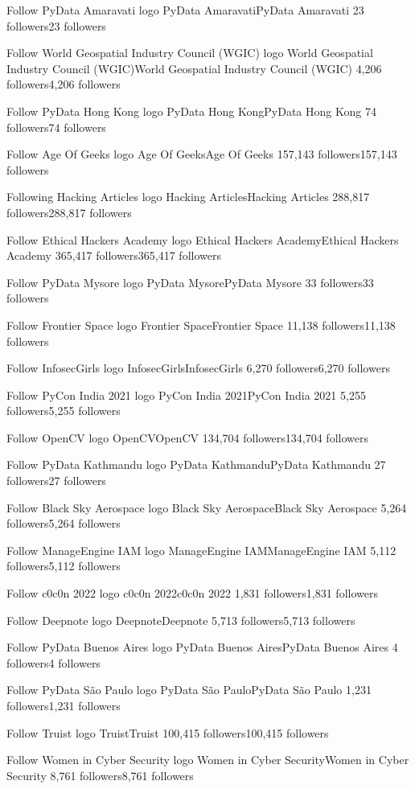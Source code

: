 Follow
PyData Amaravati logo
PyData AmaravatiPyData Amaravati
23 followers23 followers

Follow
World Geospatial Industry Council (WGIC) logo
World Geospatial Industry Council (WGIC)World Geospatial Industry Council (WGIC)
4,206 followers4,206 followers

Follow
PyData Hong Kong logo
PyData Hong KongPyData Hong Kong
74 followers74 followers

Follow
Age Of Geeks logo
Age Of GeeksAge Of Geeks
157,143 followers157,143 followers

Following
Hacking Articles logo
Hacking ArticlesHacking Articles
288,817 followers288,817 followers

Follow
Ethical Hackers Academy logo
Ethical Hackers AcademyEthical Hackers Academy
365,417 followers365,417 followers

Follow
PyData Mysore logo
PyData MysorePyData Mysore
33 followers33 followers

Follow
Frontier Space logo
Frontier SpaceFrontier Space
11,138 followers11,138 followers

Follow
InfosecGirls logo
InfosecGirlsInfosecGirls
6,270 followers6,270 followers

Follow
PyCon India 2021 logo
PyCon India 2021PyCon India 2021
5,255 followers5,255 followers

Follow
OpenCV logo
OpenCVOpenCV
134,704 followers134,704 followers

Follow
PyData Kathmandu logo
PyData KathmanduPyData Kathmandu
27 followers27 followers

Follow
Black Sky Aerospace logo
Black Sky AerospaceBlack Sky Aerospace
5,264 followers5,264 followers

Follow
ManageEngine IAM logo
ManageEngine IAMManageEngine IAM
5,112 followers5,112 followers

Follow
c0c0n 2022 logo
c0c0n 2022c0c0n 2022
1,831 followers1,831 followers

Follow
Deepnote logo
DeepnoteDeepnote
5,713 followers5,713 followers

Follow
PyData Buenos Aires logo
PyData Buenos AiresPyData Buenos Aires
4 followers4 followers

Follow
PyData São Paulo logo
PyData São PauloPyData São Paulo
1,231 followers1,231 followers

Follow
Truist logo
TruistTruist
100,415 followers100,415 followers

Follow
Women in Cyber Security logo
Women in Cyber SecurityWomen in Cyber Security
8,761 followers8,761 followers

